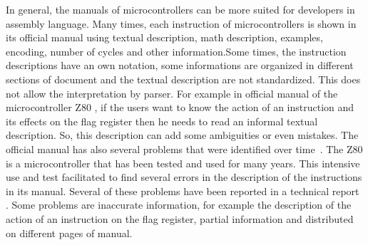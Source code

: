 \documentclass[a4paper]{llncs}
\begin{document}
In general, the manuals of microcontrollers can be more suited for
developers in assembly language. Many times, each instruction of microcontrollers
is shown in its official manual using textual description, math description, examples,
encoding, number of cycles and other information.Some times, the instruction descriptions
have an own notation, some informations are organized in different sections of document 
and the textual description are not standardized. This does not allow the interpretation by parser.
For example in official manual of the microcontroller Z80 \cite{Z80_manual}, if the users
want to know the action of an instruction and its effects on the flag register then he needs
to read an informal textual description. So, this description can add
some ambiguities or even mistakes. The official manual has also several problems that were 
identified over time~\cite{UndocumentedZ80}. The Z80 is a microcontroller that  has been
tested and used for many years. This intensive use and test facilitated to find several
errors in the description of the instructions in its manual. Several of these problems
have been reported in a technical report \cite{UndocumentedZ80}. Some problems are inaccurate
information, for example the description of the action of an instruction on the flag
register, partial information and distributed on different pages of manual.



\end{document}
